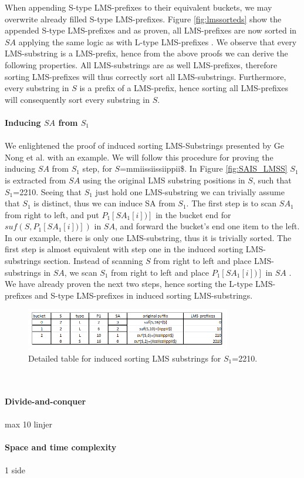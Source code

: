 \documentclass[12pt]{article} %
\begin{document}
When appending S-type LMS-prefixes to their equivalent buckets, we may overwrite already filled S-type LMS-prefixes. Figure \ref{fig:lmssorteds} show the appended S-type LMS-prefixes and as proven, all LMS-prefixes are now sorted in $SA$ applying the same logic as with L-type LMS-prefixes \cite{twoeffecient}. We observe that every LMS-substring is a LMS-prefix, hence from the above proofs we can derive the following  properties. All LMS-substrings are as well LMS-prefixes, therefore sorting LMS-prefixes will thus  correctly sort all LMS-substrings. Furthermore, every substring in $S$ is a prefix of a LMS-prefix, hence sorting all LMS-prefixes will consequently sort every substring in $S$.
\\ \\
\textbf{Inducing $SA$ from $S_1$}
\\ \\
We enlightened the proof of induced sorting LMS-Substrings presented by Ge Nong et al. \cite{twoeffecient} with an example. We will follow this procedure for proving the inducing $SA$ from $S_1$ step, for $S$=mmiissiissiippii\$.
In Figure \ref{fig:SAIS_LMSS} $S_1$ is extracted from $SA$ using the original LMS substring positions in $S$, such that $S_1$=2210. Seeing that $S_1$ just hold one LMS-substring we can trivially assume that $S_1$ is distinct, thus we can induce SA from $S_1$. The first step is to scan $SA_1$ from right to left, and put $P_1[SA_1[i])]$ in the bucket end for $suf(S, P_1[SA_1[i])] )$ in $SA$, and forward the bucket’s end one item to the left. In our example, there is only one LMS-substring, thus it is trivially sorted. 
The first step is almost equivalent with step one in the induced sorting LMS-substrings section. Instead of scanning $S$ from right to left and place LMS-substrings in $SA$, we scan $S_1$ from right to left and place $P_1[SA_1[i])]$  in $SA$ . We have already proven the next two steps, hence sorting the L-type LMS-prefixes and S-type LMS-prefixes in induced sorting LMS-substrings. 
\begin{figure}[H]
    \centering
    \includegraphics[width=0.8\textwidth]{proofS1}
    \captionsetup{width=0.8\textwidth}
    \caption{Detailed table for induced sorting LMS substrings for $S_1$=2210.}
    \label{fig:proofS1}  
\end{figure}
\\ \\
\textbf{Divide-and-conquer}
\\ \\
max 10 linjer
\\ \\
\textbf{Space and time complexity}
\\ \\
1 side
\end{document}
